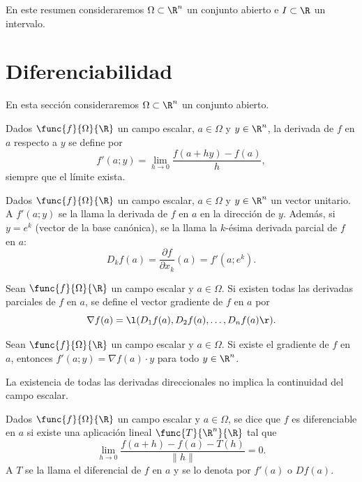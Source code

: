 \documentclass[a4,11pt]{aleph-notas}
\begin{document}
\encabezado

En este resumen consideraremos $\Omega\subset \R^n$ un conjunto abierto e $I\subset\R$ un intervalo.

\section{Diferenciabilidad}

En esta sección consideraremos $\Omega\subset \R^n$ un conjunto abierto.

\begin{defi}
    Dados $\func{f}{\Omega}{\R}$ un campo escalar, $a\in \Omega$ y $y\in \R^n$, la derivada de $f$ en $a$ respecto a $y$ se define por
    \[
        f'(a;y)=\lim_{h\to 0}\frac{f(a+hy)-f(a)}{h},
    \]
    siempre que el límite exista.
\end{defi}

\begin{defi}
    Dados $\func{f}{\Omega}{\R}$ un campo escalar, $a\in \Omega$ y $y\in \R^n$ un vector unitario. A $f'(a;y)$ se la llama la derivada de $f$ en $a$ en la dirección de $y$. Además, si $y=e^k$ (vector de la base canónica), se la llama la $k$-ésima derivada parcial de $f$ en $a$:
    \[
        D_k f(a)=\frac{\partial f}{\partial x_k}(a)=f'(a;e^k).
    \]
\end{defi}

\begin{defi}[Gradiente]
    Sean $\func{f}{\Omega}{\R}$ un campo escalar y $a\in \Omega$. Si existen todas las derivadas parciales de $f$ en $a$, se define el vector gradiente de $f$ en $a$ por
    \[
        \nabla f(a) = \l(D_1 f(a), D_2 f(a),\ldots, D_n f(a)\r).
    \]
\end{defi}

\begin{prop}
    Sean $\func{f}{\Omega}{\R}$ un campo escalar y $a\in \Omega$. Si existe el gradiente de $f$ en $a$, entonces $f'(a;y)=\nabla f(a)\cdot y$ para todo $y\in\R^n$.
\end{prop}

\begin{advertencia}
    La existencia de todas las derivadas direccionales no implica la continuidad del campo escalar.
\end{advertencia}

\begin{defi}[Diferenciabilidad]
    Dados $\func{f}{\Omega}{\R}$ un campo escalar y $a\in \Omega$, se dice que $f$ es diferenciable en $a$ si existe una aplicación lineal $\func{T}{\R^n}{\R}$ tal que
    \[
        \lim_{h\to 0}\frac{f(a+h)-f(a)-T(h)}{\|h\|}=0.
    \]
    A $T$ se la llama el diferencial de $f$ en $a$ y se lo denota por $f'(a)$ o $Df(a)$.
\end{defi}
\end{document}
